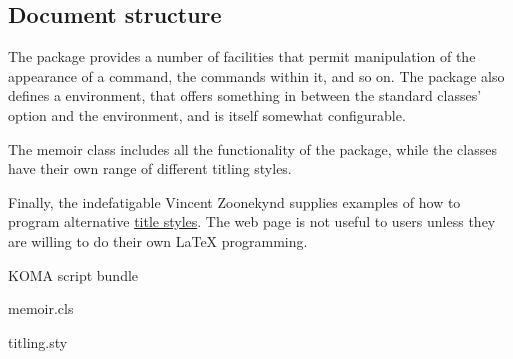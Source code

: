 \subsection{Document structure}


The  package provides a number of facilities that
permit manipulation of the appearance of a  command, the
 commands within it, and so on.  The package also defines a
 environment, that offers something in between the
standard classes'  option and the 
environment, and is itself somewhat configurable.

The memoir class includes all the functionality of the
 package, while the  classes have
their own range of different titling styles.

Finally, the indefatigable Vincent Zoonekynd supplies examples of how
to program alternative %
\href{http://zoonek.free.fr/LaTeX/LaTeX_samples_title/0.html}{title styles}.
The web page is not useful to users unless they are willing to do
their own \LaTeX{} programming.
\begin{ctanrefs}
\item[\nothtml{\rmfamily}KOMA script bundle]
\item[memoir.cls]
\item[titling.sty]
\end{ctanrefs}


